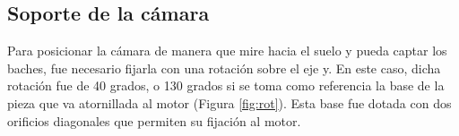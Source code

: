 	



\subsection{Soporte de la cámara}
\label{subsec:soportecamara}

Para posicionar la cámara de manera que mire hacia el suelo y pueda captar los baches, fue necesario fijarla con una rotación sobre el eje y. En este caso, dicha rotación fue de 40 grados, o 130 grados si se toma como referencia la base de la pieza que va atornillada al motor (Figura \ref{fig:rot}). Esta base fue dotada con dos orificios diagonales que permiten su fijación al motor.

